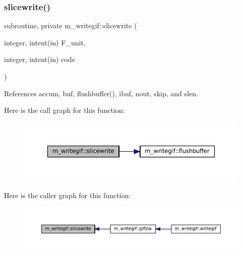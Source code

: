 \subsubsection{\texorpdfstring{slicewrite()}{slicewrite()}}
{\footnotesize\ttfamily subroutine, private m\+\_\+writegif\+::slicewrite (\begin{DoxyParamCaption}\item[{integer, intent(in)}]{F\+\_\+unit,  }\item[{integer, intent(in)}]{code }\end{DoxyParamCaption})\hspace{0.3cm}{\ttfamily [private]}}



References accum, buf, flushbuffer(), ibuf, nout, skip, and slen.

Here is the call graph for this function\+:\nopagebreak
\begin{figure}[H]
\begin{center}
\leavevmode
\includegraphics[width=350pt]{namespacem__writegif_a27e0ec2c6e05428641179bf35762adb7_cgraph}
\end{center}
\end{figure}
Here is the caller graph for this function\+:\nopagebreak
\begin{figure}[H]
\begin{center}
\leavevmode
\includegraphics[width=350pt]{namespacem__writegif_a27e0ec2c6e05428641179bf35762adb7_icgraph}
\end{center}
\end{figure}
\mbox{\label{namespacem__writegif_a02be37849028b2f9484cff1b4285375d}} 
